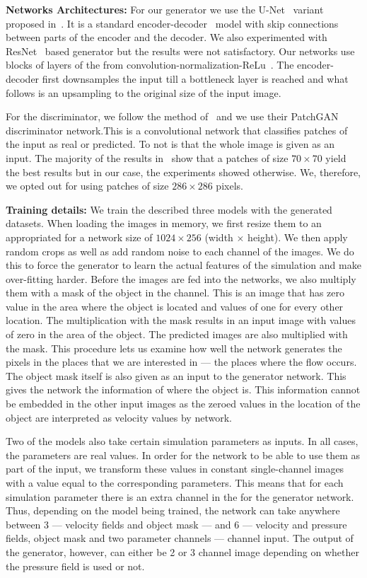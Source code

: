 \documentclass{llncs}
\begin{document}
\noindent\textbf{Networks Architectures:} For our generator we use the U-Net~\cite{ronneberger2015} variant proposed in~\cite{pix2pix}. It is a standard encoder-decoder~\cite{hinton2006} model with skip connections between parts of the encoder and the decoder. We also experimented with ResNet~\cite{he2015} based generator but the results were not satisfactory. Our networks use blocks of layers of the from convolution-normalization-ReLu~\cite{batchnorm}. The encoder-decoder first downsamples the input till a bottleneck layer is reached and what follows is an upsampling to the original size of the input image.

For the discriminator, we follow the method of~\cite{pix2pix} and we use their PatchGAN discriminator network.\@ This is a convolutional network that classifies patches of the input as real or predicted. To not is that the whole image is given as an input. The majority of the results in~\cite{pix2pix} show that a patches of size $70\times 70$ yield the best results but in our case, the experiments showed otherwise. We, therefore, we opted out for using patches of size $286\times 286$ pixels.

\noindent\textbf{Training details:} We train the described three models with the generated datasets. When loading the images in memory, we first resize them to an appropriated for a network size of $1024\times 256$ (width $\times$ height). We then apply random crops as well as add random noise to each channel of the images. We do this to force the generator to learn the actual features of the simulation and make over-fitting harder. Before the images are fed into the networks, we also multiply them with a mask of the object in the channel. This is an image that has zero value in the area where the object is located and values of one for every other location. The multiplication with the mask results in an input image with values of zero in the area of the object. The predicted images are also multiplied with the mask. This procedure lets us examine how well the network generates the pixels in the places that we are interested in --- the places where the flow occurs. The object mask itself is also given as an input to the generator network. This gives the network the information of where the object is. This information cannot be embedded in the other input images as the zeroed values in the location of the object are interpreted as velocity values by network.

Two of the models also take certain simulation parameters as inputs. In all cases, the parameters are real values. In order for the network to be able to use them as part of the input, we transform these values in constant single-channel images with a value equal to the corresponding parameters. This means that for each simulation parameter there is an extra channel in the for the generator network. Thus, depending on the model being trained, the network can take anywhere between 3 --- velocity fields and object mask --- and 6 --- velocity and pressure fields, object mask and two parameter channels --- channel input. The output of the generator, however, can either be 2 or 3 channel image depending on whether the pressure field is used or not.
\end{document}
